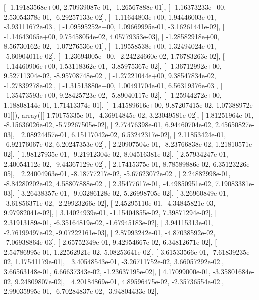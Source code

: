 \documentclass{article}
\begin{document}
       [ -1.19183568e+00,   2.70939087e-01,  -1.26567888e-01],
       [ -1.16373233e+00,   2.53054378e-01,  -6.29257133e-02],
       [ -1.11644803e+00,   1.94446003e-01,  -3.93111672e-03],
       [ -1.09595252e+00,   1.09669995e-01,  -3.16261441e-02],
       [ -1.14643065e+00,   9.75458054e-02,   4.05779353e-03],
       [ -1.28582918e+00,   8.56730162e-02,  -1.07276536e-01],
       [ -1.19558538e+00,   1.32494024e-01,  -5.60904011e-02],
       [ -1.23694005e+00,  -2.24224660e-02,   1.76783263e-02],
       [ -1.14460906e+00,   1.53118362e-01,  -3.85975367e-02],
       [ -1.36712992e+00,   9.52711304e-02,  -8.95708748e-02],
       [ -1.27221044e+00,   9.38547834e-02,  -1.27839278e-02],
       [ -1.31513880e+00,   1.00491704e-01,   6.56319376e-03],
       [ -1.35473593e+00,   9.28425723e-02,  -5.89040117e-02],
       [ -1.25944272e+00,   1.18808144e-01,   1.71413374e-01],
       [ -1.41589616e+00,   9.87207415e-02,   1.07388972e-01]]), array([[  1.70175335e-01,  -4.36914845e-02,   3.23049581e-02],
       [  1.81251964e-01,  -8.15636026e-02,  -5.79267505e-02],
       [  2.77476398e-01,   6.94460704e-02,   2.45650827e-03],
       [  2.08924457e-01,   6.15117042e-02,   6.53242317e-02],
       [  2.11853424e-01,  -6.92176067e-02,   6.20247353e-02],
       [  2.20907504e-01,  -8.23766838e-02,   1.21810571e-02],
       [  1.98127935e-01,  -9.21912304e-02,   8.04516381e-02],
       [  2.57934247e-01,   2.40054112e-02,  -9.44367129e-02],
       [  2.17415375e-01,   8.78589886e-02,   6.35123226e-05],
       [  2.24004963e-01,  -8.18777217e-02,  -5.67623072e-02],
       [  2.24882998e-01,  -8.84280202e-02,   4.58807888e-02],
       [  2.35477617e-01,  -4.49850951e-02,   7.19083381e-03],
       [  3.26438357e-01,  -9.03286128e-02,   5.26998705e-02],
       [  3.26960849e-01,  -3.61856371e-02,  -2.29923266e-02],
       [  2.45295110e-01,  -4.34845821e-03,   9.97982041e-02],
       [  3.14024939e-01,  -1.15404855e-02,   7.39871294e-02],
       [  2.31913189e-01,  -6.35164819e-02,  -1.67945183e-02],
       [  3.94115313e-01,  -2.76199497e-02,  -9.07222161e-03],
       [  2.87993242e-01,  -4.87038592e-02,  -7.06938864e-03],
       [  2.65752349e-01,   9.42954667e-02,   6.34812671e-02],
       [  2.54786995e-01,   1.22562921e-02,   5.08253641e-02],
       [  3.61533566e-01,  -7.61839235e-02,   1.17541179e-01],
       [  3.40548543e-01,  -3.26711752e-02,   3.66057292e-02],
       [  3.66563148e-01,   6.66637343e-02,  -1.23637195e-02],
       [  4.17099000e-01,  -3.35801684e-02,   9.24809807e-02],
       [  4.20184869e-01,   4.89596475e-02,  -2.35736554e-02],
       [  2.99035995e-01,  -6.70284837e-02,  -3.94804433e-02],
\end{document}
